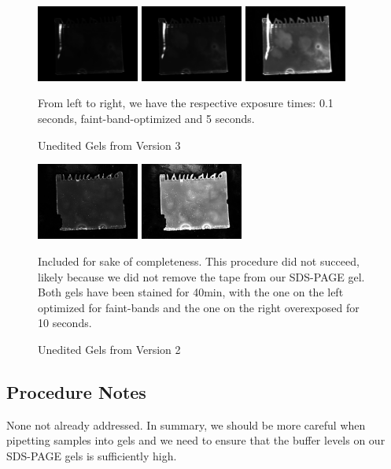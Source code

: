 \documentclass[letterpaper]{article}
\begin{document}
\begin{figure}[ht]
\begin{center}

\includegraphics[width=0.3\textwidth]{./gels/under-_05s-small.png}
\includegraphics[width=0.3\textwidth]{./gels/faintbands-small.png}
\includegraphics[width=0.3\textwidth]{./gels/over-5s-small.png}

\label{gels3}
\caption{Unedited Gels from Version 3}
From left to right, we have the respective exposure times: 0.1 seconds, faint-band-optimized and 5 seconds.
\end{center}
\end{figure}


\begin{figure}[ht]
\begin{center}

\includegraphics[width=0.3\textwidth]{./gels-old/40min-stain-40min-small.png}
\includegraphics[width=0.3\textwidth]{./gels-old/overexpose-40min_stain-10sec-small.png}

\label{gels2}
\caption{Unedited Gels from Version 2}
Included for sake of completeness. This procedure did not succeed, likely because we did not remove the tape from our SDS-PAGE gel. Both gels have been stained for 40min, with the one on the left optimized for faint-bands and the one on the right overexposed for 10 seconds.
\end{center}
\end{figure}

\subsection{Procedure Notes}
None not already addressed. In summary, we should be more careful when pipetting samples into gels and we need to ensure that the buffer levels on our SDS-PAGE gels is sufficiently high.
\listoffigures


\end{document}
